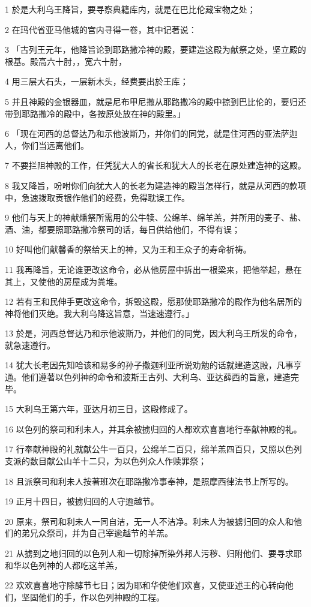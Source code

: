 \par 1 於是大利乌王降旨，要寻察典籍库内，就是在巴比伦藏宝物之处；
\par 2 在玛代省亚马他城的宫内寻得一卷，其中记著说：
\par 3 「古列王元年，他降旨论到耶路撒冷神的殿，要建造这殿为献祭之处，坚立殿的根基。殿高六十肘，，宽六十肘，
\par 4 用三层大石头，一层新木头，经费要出於王库；
\par 5 并且神殿的金银器皿，就是尼布甲尼撒从耶路撒冷的殿中掠到巴比伦的，要归还带到耶路撒冷的殿中，各按原处放在神的殿里。」
\par 6 「现在河西的总督达乃和示他波斯乃，并你们的同党，就是住河西的亚法萨迦人，你们当远离他们。
\par 7 不要拦阻神殿的工作，任凭犹大人的省长和犹大人的长老在原处建造神的这殿。
\par 8 我又降旨，吩咐你们向犹大人的长老为建造神的殿当怎样行，就是从河西的款项中，急速拨取贡银作他们的经费，免得耽误工作。
\par 9 他们与天上的神献燔祭所需用的公牛犊、公绵羊、绵羊羔，并所用的麦子、盐、酒、油，都要照耶路撒冷祭司的话，每日供给他们，不得有误；
\par 10 好叫他们献馨香的祭给天上的神，又为王和王众子的寿命祈祷。
\par 11 我再降旨，无论谁更改这命令，必从他房屋中拆出一根梁来，把他举起，悬在其上，又使他的房屋成为粪堆。
\par 12 若有王和民伸手更改这命令，拆毁这殿，愿那使耶路撒冷的殿作为他名居所的神将他们灭绝。我大利乌降这旨意，当速速遵行。」
\par 13 於是，河西总督达乃和示他波斯乃，并他们的同党，因大利乌王所发的命令，就急速遵行。
\par 14 犹大长老因先知哈该和易多的孙子撒迦利亚所说劝勉的话就建造这殿，凡事亨通。他们遵著以色列神的命令和波斯王古列、大利乌、亚达薛西的旨意，建造完毕。
\par 15 大利乌王第六年，亚达月初三日，这殿修成了。
\par 16 以色列的祭司和利未人，并其余被掳归回的人都欢欢喜喜地行奉献神殿的礼。
\par 17 行奉献神殿的礼就献公牛一百只，公绵羊二百只，绵羊羔四百只，又照以色列支派的数目献公山羊十二只，为以色列众人作赎罪祭；
\par 18 且派祭司和利未人按著班次在耶路撒冷事奉神，是照摩西律法书上所写的。
\par 19 正月十四日，被掳归回的人守逾越节。
\par 20 原来，祭司和利未人一同自洁，无一人不洁净。利未人为被掳归回的众人和他们的弟兄众祭司，并为自己宰逾越节的羊羔。
\par 21 从掳到之地归回的以色列人和一切除掉所染外邦人污秽、归附他们、要寻求耶和华以色列神的人都吃这羊羔，
\par 22 欢欢喜喜地守除酵节七日；因为耶和华使他们欢喜，又使亚述王的心转向他们，坚固他们的手，作以色列神殿的工程。

